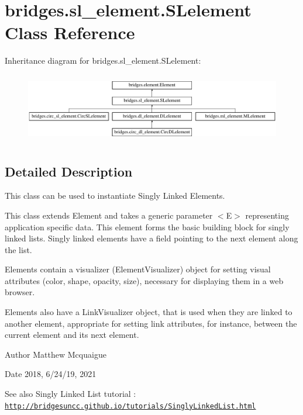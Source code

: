 \hypertarget{classbridges_1_1sl__element_1_1_s_lelement}{}\section{bridges.\+sl\+\_\+element.\+S\+Lelement Class Reference}
\label{classbridges_1_1sl__element_1_1_s_lelement}
Inheritance diagram for bridges.\+sl\+\_\+element.\+S\+Lelement\+:\begin{figure}[H]
\begin{center}
\leavevmode
\includegraphics[height=3.085400cm]{classbridges_1_1sl__element_1_1_s_lelement}
\end{center}
\end{figure}


\subsection{Detailed Description}
This class can be used to instantiate Singly Linked Elements. 

This class extends Element and takes a generic parameter $<$\+E$>$ representing application specific data. This element forms the basic building block for singly linked lists. Singly linked elements have a field pointing to the next element along the list.

Elements contain a visualizer (Element\+Visualizer) object for setting visual attributes (color, shape, opacity, size), necessary for displaying them in a web browser.

Elements also have a Link\+Visualizer object, that is used when they are linked to another element, appropriate for setting link attributes, for instance, between the current element and its next element.

\begin{DoxyAuthor}{Author}
Matthew Mcquaigue 
\end{DoxyAuthor}
\begin{DoxyDate}{Date}
2018, 6/24/19, 2021
\end{DoxyDate}
\begin{DoxySeeAlso}{See also}
Singly Linked List tutorial \+: \href{http://bridgesuncc.github.io/tutorials/SinglyLinkedList.html}{\tt http\+://bridgesuncc.\+github.\+io/tutorials/\+Singly\+Linked\+List.\+html} 
\end{DoxySeeAlso}
